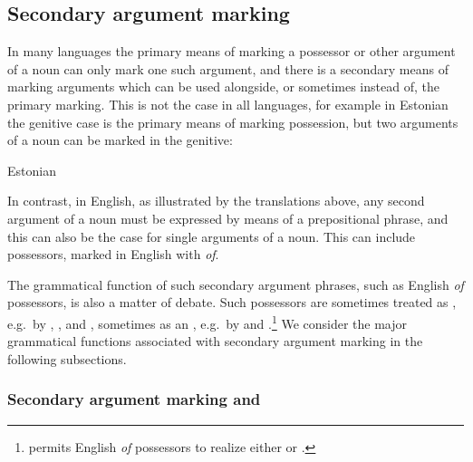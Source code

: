 \documentclass[output=paper,hidelinks]{langscibook}
\begin{document}
\subsection{Secondary argument marking}
\label{sam}

In many languages the primary means of marking a possessor or other argument of a noun can only mark one such argument, and there is a secondary means of marking arguments which can be used alongside, or sometimes instead of, the primary marking. This is not the case in all languages, for example in Estonian the genitive case is the primary means of marking possession, but two arguments of a noun can be marked in the genitive:

\eal Estonian  \citep[732]{KoptTamm02an}
\zl

In contrast, in English, as illustrated by the translations above, any second argument of a noun must be expressed by means of a prepositional phrase, and this can also be the case for single arguments of a noun. This can include possessors, marked in English with \emph{of}. 

The grammatical function of such secondary argument phrases, such as English \emph{of} possessors, is also a matter of debate. Such possessors are sometimes treated as {\ADJ}, e.g.\ by  \citet{ButtEtAl1999}, \citet{Sadler00}, and \citet{Lowe17}, sometimes as an , e.g.\ by \citet{Rappaport83} and \citet{BresnanEtAl2016}.\footnote{\citet{Laczko95} permits English \emph{of} possessors to realize either {\OBLTHETA} or {\POSS}.
} We consider the major grammatical functions associated with secondary argument marking in the following subsections.




\subsubsection{Secondary argument marking and {\OBJ}}
\end{document}

